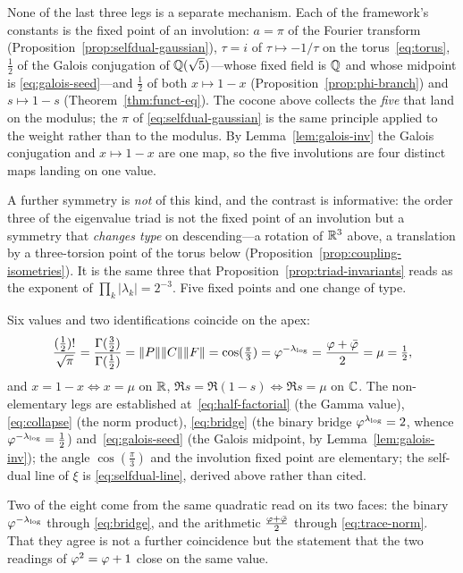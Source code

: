 \begin{remark}\label{rmk:pi-selfdual}
None of the last three legs is a separate mechanism. Each of the framework's constants is the fixed point of
an involution: $a=\pi$ of the Fourier transform (Proposition~\ref{prop:selfdual-gaussian}),
$\tau=i$ of $\tau\mapsto-1/\tau$ on the torus~\eqref{eq:torus}, $\tfrac12$ of the
Galois conjugation of $\mathbb{Q}(\sqrt5)$---whose fixed field is $\mathbb{Q}$ and whose midpoint is
\eqref{eq:galois-seed}---and $\tfrac12$ of both $x\mapsto1-x$
(Proposition~\ref{prop:phi-branch}) and
$s\mapsto1-s$ (Theorem~\ref{thm:funct-eq}). The cocone above collects the \emph{five} that land on the
modulus; the $\pi$ of \eqref{eq:selfdual-gaussian} is the same principle applied to the weight
rather than to the modulus. By Lemma~\ref{lem:galois-inv} the Galois conjugation and
$x\mapsto1-x$ are one map, so the five involutions are four distinct maps landing on one value.

A further symmetry is \emph{not} of this kind, and the contrast is informative: the order three of
the eigenvalue triad is not the fixed point of an involution but a symmetry that \emph{changes
type} on descending---a rotation of $\mathbb{R}^{3}$ above, a translation by a three-torsion point of the
torus below (Proposition~\ref{prop:coupling-isometries}). It is the same three that
Proposition~\ref{prop:triad-invariants} reads as the exponent of
$\prod_k|\lambda_k|=2^{-3}$. Five fixed points and one change of type.
\end{remark}

\begin{theorem}\label{thm:mu-diagram}
Six values and two identifications coincide on the apex:
\[
\dfrac{(\tfrac12)!}{\sqrt\pi}=\dfrac{\Gamma(\tfrac32)}{\Gamma(\tfrac12)}
=\|P\|\|C\|\|F\|=\cos(\tfrac{\pi}{3})=\varphi^{-\lambda_{\log}}
=\dfrac{\varphi+\bar{\varphi}}{2}=\mu=\tfrac12 ,
\]
and $x=1-x\iff x=\mu$ on $\mathbb{R}$, $\Re s=\Re(1-s)\iff\Re s=\mu$ on $\mathbb{C}$.
The non-elementary legs are established at~\eqref{eq:half-factorial} (the Gamma value),
\eqref{eq:collapse} (the norm product), \eqref{eq:bridge} (the binary bridge
$\varphi^{\lambda_{\log}}=2$, whence $\varphi^{-\lambda_{\log}}=\tfrac12$) and~\eqref{eq:galois-seed} (the Galois
midpoint, by Lemma~\ref{lem:galois-inv}); the angle $\cos(\tfrac{\pi}{3})$
and the involution fixed point are elementary; the self-dual line of $\xi$ is
\eqref{eq:selfdual-line}, derived above rather than cited.

Two of the eight come from the same quadratic read on its two faces: the binary
$\varphi^{-\lambda_{\log}}$ through \eqref{eq:bridge}, and the arithmetic
$\tfrac{\varphi+\bar{\varphi}}{2}$ through \eqref{eq:trace-norm}. That they agree is not a further
coincidence but the statement that the two readings of $\varphi^{2}=\varphi+1$ close on the same
value.

\end{theorem}

